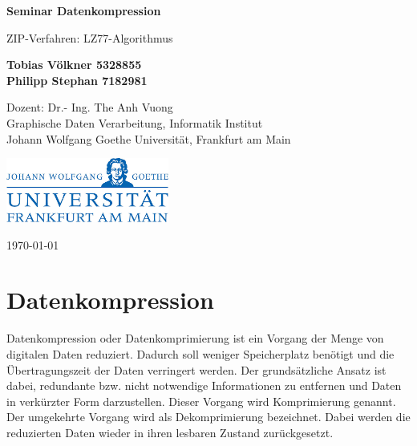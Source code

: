\documentclass[10pt, a4paper]{article}
\begin{document}
\begin{titlepage}
    \begin{center}
        \vspace*{3cm}
            
        \Huge
        \textbf{Seminar Datenkompression}
            
        \vspace{1cm}
        \huge
        ZIP-Verfahren: LZ77-Algorithmus
            
        \vspace{1.5cm}
        \Large
            
        \textbf{Tobias Völkner 5328855}\\  %
        \textbf{Philipp Stephan 7182981}    %
        
            
        \vfill
        
        Dozent: Dr.- Ing. The Anh Vuong\\
        Graphische Daten Verarbeitung, Informatik Institut\\
        Johann Wolfgang Goethe Universität, Frankfurt am Main

            
        \vspace{1cm}
            
        \includegraphics[width=0.4\textwidth]{pictures/Goethe_University_logo.jpg}
        \\
        
        \Large
        
        \today
            
    \end{center}
\end{titlepage}

\newpage
\tableofcontents
\newpage

\section{Datenkompression}
Datenkompression oder Datenkomprimierung ist ein Vorgang der Menge von digitalen Daten reduziert. Dadurch soll weniger Speicherplatz benötigt und die Übertragungszeit der Daten verringert werden. Der grundsätzliche Ansatz ist dabei, redundante bzw. nicht notwendige Informationen zu entfernen und Daten in verkürzter Form darzustellen. Dieser Vorgang wird Komprimierung genannt. Der umgekehrte Vorgang wird als Dekomprimierung bezeichnet. Dabei werden die reduzierten Daten wieder in ihren lesbaren Zustand zurückgesetzt. \\
\end{document}
